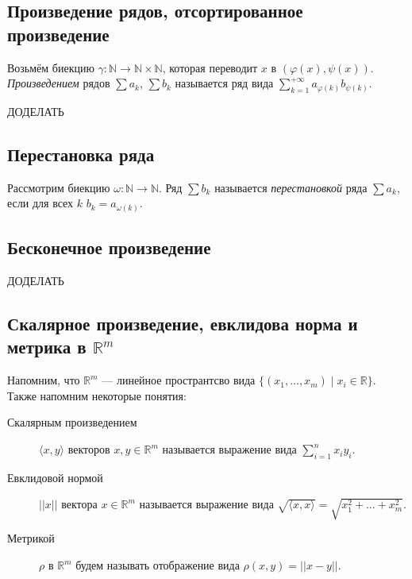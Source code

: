 \subsection{Произведение рядов, отсортированное произведение}

\begin{definition}
	Возьмём биекцию \(\gamma \colon \mathbb{N} \to \mathbb{N} \times \mathbb{N}\), которая переводит \(x\) в \((\varphi(x), \psi(x))\). \textit{Произведением} рядов \(\sum a_k\), \(\sum b_k\) называется ряд вида \(\sum_{k=1}^{+\infty} a_{\varphi(k)} b_{\psi(k)}\).
	
	ДОДЕЛАТЬ
\end{definition}

\subsection{Перестановка ряда}

\begin{definition}
	Рассмотрим биекцию \(\omega \colon \mathbb{N} \to \mathbb{N}\). Ряд \(\sum b_k\) называется \textit{перестановкой} ряда \(\sum a_k\), если для всех \(k\) \(b_k = a_{\omega(k)}\). 
\end{definition}

\subsection{Бесконечное произведение}

ДОДЕЛАТЬ

\subsection{Скалярное произведение, евклидова норма и метрика в \(\mathbb{R}^m\)}

\begin{definition}
	Напомним, что \(\mathbb{R}^m\) --- линейное пространтсво вида \linebreak \(\{(x_1, \ldots, x_m) \mid x_i \in \mathbb{R}\}\). Также напомним некоторые понятия:
	\begin{description}
		\item[Скалярным произведением] \(\langle x, y \rangle\) векторов \(x, y \in \mathbb{R}^m\) называется выражение вида \( \sum\limits_{i=1}^n x_i y_i\).
		\item[Евклидовой нормой] \(||x||\) вектора \(x \in \mathbb{R}^m\) называется выражение вида \linebreak \(\sqrt{\langle x, x \rangle} = \sqrt{x_1^2 + \ldots + x_m^2}\).
		\item[Метрикой] \(\rho\) в \(\mathbb{R}^m\) будем называть отображение вида \(\rho(x, y) = || x - y||\). 
	\end{description}
\end{definition}

